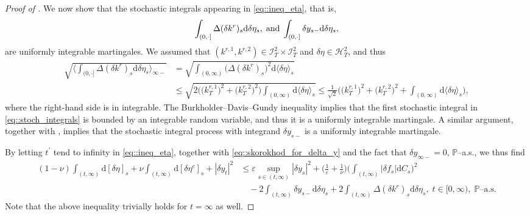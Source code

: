 \documentclass[10pt]{article} %
\newcommand\cH{\mathcal H}
\newcommand\cI{\mathcal I}
\def \P{\mathbb{P}}
\def\d{\mathrm{d}}
\begin{document}
\begin{proof}[Proof of ]
\medskip
We now show that the stochastic integrals appearing in \eqref{eq::ineq_eta}, that is,
\begin{equation}\label{eq::stoch_integrals}
	\int_{(0,\cdot]} \Delta (\delta k^r)_s \d \delta \eta_s,\; \text{\rm and} \; \int_{(0,\cdot]} \delta y_{s-} \d \delta \eta_s,
\end{equation}
are uniformly integrable martingales. We assumed that $ (k^{r,1}, k^{r,2}) \in \cI^2_T \times \cI^2_T$ and $\delta \eta \in \cH^2_T$, and thus
\begin{align*}
	\sqrt{\bigg\langle \int_{(0,\cdot]} \Delta (\delta k^r)_s \d \delta \eta_s \bigg\rangle_{\infty-}} 
	&= \sqrt{\int_{(0,\infty)} \big(\Delta (\delta k^r)_s\big)^2 \d \langle\delta \eta \rangle_s} \\
	&\leq \sqrt{2 \Big(\big(k^{r,1}_T\big)^2 + \big(k^{r,2}_T\big)^2\Big) \int_{(0,\infty)} \d \langle \delta \eta \rangle_s} 
	\leq \frac{1}{\sqrt{2}} \bigg(\big(k^{r,1}_T\big)^2 + \big(k^{r,2}_T\big)^2 + \int_{(0,\infty)} \d \langle \delta \eta \rangle_s \bigg),
\end{align*}
where the right-hand side is in integrable. The Burkholder--Davis--Gundy inequality implies that the first stochastic integral in \eqref{eq::stoch_integrals} is bounded by an integrable random variable, and thus it is a uniformly integrable martingale. A similar argument, together with , implies that the stochastic integral process with integrand $\delta y_{s-}$ is a uniformly integrable martingale.

\medskip
By letting $t^\prime$ tend to infinity in \eqref{eq::ineq_eta}, together with \eqref{eq::skorokhod_for_delta_y} and the fact that $\delta y_{\infty-} = 0$, $\P$--a.s., we thus find
\begin{align}\label{eq::ineq_eta2}
	(1-\nu) \int_{(t,\infty)} \d [\delta \eta]_s + \nu \int_{(t,\infty)} \d [\delta \eta^c]_s + |\delta y_t|^2
	&\leq \varepsilon \sup_{s \in (t,\infty)} |\delta y_s|^2 + \bigg(\frac{1}{\varepsilon} + \frac{1}{\nu}\bigg) \bigg( \int_{(t,\infty)} |\delta f_s| \d C_s \bigg)^2  \nonumber \\
	&\quad - 2 \int_{(t,\infty)} \delta y_{s-} \d \delta \eta_s + 2\int_{(t,\infty)} \Delta (\delta k^r)_s \d \delta \eta_s, \; t \in [0,\infty), \; \text{$\P$--a.s.}
\end{align}
Note that the above inequality trivially holds for $t = \infty$ as well.






\end{proof}
\end{document}
